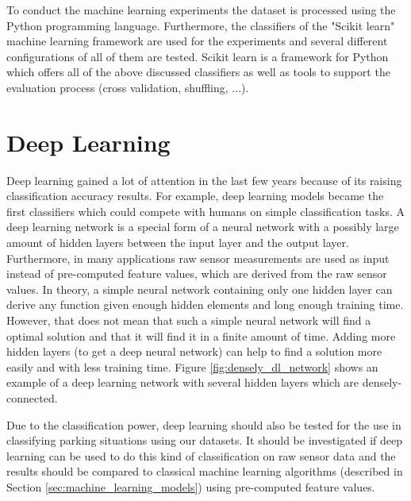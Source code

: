 To conduct the machine learning experiments the dataset is processed using the Python programming language. Furthermore, the classifiers of the "Scikit learn" machine learning framework are used for the experiments and several different configurations of all of them are tested. Scikit learn is a framework for Python which offers all of the above discussed classifiers as well as tools to support the evaluation process (cross validation, shuffling, ...).






\section{Deep Learning}
\label{sec:deep_learning}

Deep learning gained a lot of attention in the last few years because of its raising classification accuracy results. For example, deep learning models became the first classifiers which could compete with humans on simple classification tasks. A deep learning network is a special form of a neural network with a possibly large amount of hidden layers between the input layer and the output layer. Furthermore, in many applications raw sensor measurements are used as input instead of pre-computed feature values, which are derived from the raw sensor values. In theory, a simple neural network containing only one hidden layer can derive any function given enough hidden elements and long enough training time. However, that does not mean that such a simple neural network will find a optimal solution and that it will find it in a finite amount of time. Adding more hidden layers (to get a deep neural network) can help to find a solution more easily and with less training time. 
Figure \ref{fig:densely_dl_network} shows an example of a deep learning network with several hidden layers which are densely-connected.

Due to the classification power, deep learning should also be tested for the use in classifying parking situations using our datasets. It should be investigated if deep learning can be used to do this kind of classification on raw sensor data and the results should be compared to classical machine learning algorithms (described in Section \ref{sec:machine_learning_models}) using pre-computed feature values.


